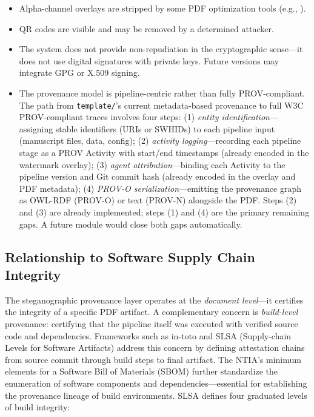 \documentclass[
  english,
]{article}
\providecommand{\tightlist}{%
  \setlength{\itemsep}{0pt}\setlength{\parskip}{0pt}}
\begin{document}
\begin{itemize}
\tightlist
\item
  Alpha-channel overlays are stripped by some PDF optimization tools
  (e.g., ).
\item
  QR codes are visible and may be removed by a determined attacker.
\item
  The system does not provide non-repudiation in the cryptographic
  sense---it does not use digital signatures with private keys. Future
  versions may integrate GPG or X.509 signing.
\item
  The provenance model is pipeline-centric rather than fully
  PROV-compliant. The path from \texttt{template/}'s current
  metadata-based provenance to full W3C PROV-compliant traces involves
  four steps: (1) \emph{entity identification}---assigning stable
  identifiers (URIs or SWHIDs) to each pipeline input (manuscript files,
  data, config); (2) \emph{activity logging}---recording each pipeline
  stage as a PROV Activity with start/end timestamps (already encoded in
  the watermark overlay); (3) \emph{agent attribution}---binding each
  Activity to the pipeline version and Git commit hash (already encoded
  in the overlay and PDF metadata); (4) \emph{PROV-O
  serialization}---emitting the provenance graph as OWL-RDF (PROV-O) or
  text (PROV-N) alongside the PDF. Steps (2) and (3) are already
  implemented; steps (1) and (4) are the primary remaining gaps. A
  future  module would close both gaps
  automatically.
\end{itemize}

\subsection{Relationship to Software Supply Chain
Integrity}\label{relationship-to-software-supply-chain-integrity}

The steganographic provenance layer operates at the \emph{document
level}---it certifies the integrity of a specific PDF artifact. A
complementary concern is \emph{build-level} provenance: certifying that
the pipeline itself was executed with verified source code and
dependencies. Frameworks such as in-toto \citep{torresarias2019intoto}
and SLSA (Supply-chain Levels for Software Artifacts) address this
concern by defining attestation chains from source commit through build
steps to final artifact. The NTIA's minimum elements for a Software Bill
of Materials (SBOM) \citep{ntia2021sbom} further standardize the
enumeration of software components and dependencies---essential for
establishing the provenance lineage of build environments. SLSA defines
four graduated levels of build integrity:
\end{document}
